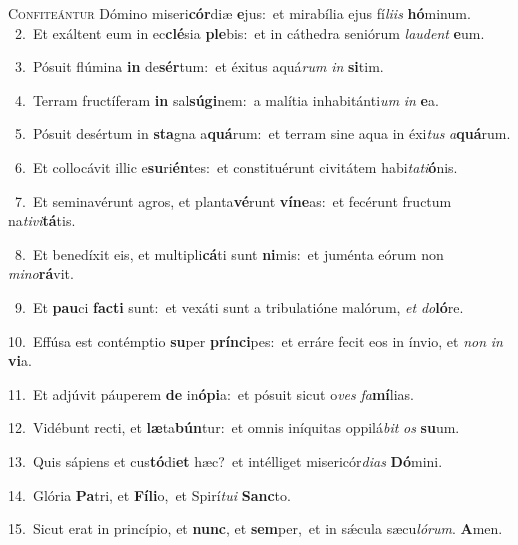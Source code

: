 \lettrine{\initial\textcolor{\initialcolor}{C}}{onfiteántur} Dómino miseri\-\textbf{cór}\-diæ \textbf{e}\-jus:~\star et mirabília ejus fí\-\textit{li}\-\textit{is} \textbf{hó}\-minum.\\
{\numbfont\textcolor{\numbcolor}{~2.}}~Et exáltent eum in ec\-\textbf{clé}\-sia \textbf{ple}\-bis:~\star et in cáthedra seniórum \textit{lau}\-\textit{dent} \textbf{e}\-um.\par
{\numbfont\textcolor{\numbcolor}{~3.}}~Pósuit flúmina \textbf{in} de\-\textbf{sér}\-tum:~\star et éxitus aquá\textit{rum} \textit{in} \textbf{si}\-tim.\par
{\numbfont\textcolor{\numbcolor}{~4.}}~Terram fructíferam \textbf{in} sal\-\textbf{sú}\-\textbf{gi}nem:~\star a malítia inhabitánti\textit{um} \textit{in} \textbf{e}\-a.\par
{\numbfont\textcolor{\numbcolor}{~5.}}~Pósuit desértum in \textbf{sta}\-gna a\-\textbf{quá}\-rum:~\star et terram sine aqua in éxi\textit{tus} \textit{a}\-\textbf{quá}rum.\par
{\numbfont\textcolor{\numbcolor}{~6.}}~Et collocávit illic e\-\textbf{su}\-ri\-\textbf{én}\-tes:~\star et constituérunt civitátem habi\-\textit{ta}\-\textit{ti}\textbf{ó}nis.\par
{\numbfont\textcolor{\numbcolor}{~7.}}~Et seminavérunt agros, et planta\-\textbf{vé}\-runt \textbf{ví}\-\textbf{ne}as:~\star et fecérunt fructum na\-\textit{ti}\-\textit{vi}\textbf{tá}tis.\par
{\numbfont\textcolor{\numbcolor}{~8.}}~Et benedíxit eis, et multipli\-\textbf{cá}\-ti sunt \textbf{ni}\-mis:~\star et juménta eórum non \textit{mi}\-\textit{no}\textbf{rá}vit.\par
{\numbfont\textcolor{\numbcolor}{~9.}}~Et \textbf{pau}\-ci \textbf{fac}\-\textbf{ti} sunt:~\star et vexáti sunt a tribulatióne malórum, \textit{et} \textit{do}\-\textbf{ló}re.\par
{\numbfont\textcolor{\numbcolor}{10.}}~Effúsa est contémptio \textbf{su}\-per \textbf{prín}\-\textbf{ci}pes:~\star et erráre fecit eos in ínvio, et \textit{non} \textit{in} \textbf{vi}\-a.\par
{\numbfont\textcolor{\numbcolor}{11.}}~Et adjúvit páuperem \textbf{de} in\-\textbf{ó}\-\textbf{pi}a:~\star et pósuit sicut o\textit{ves} \textit{fa}\-\textbf{mí}lias.\par
{\numbfont\textcolor{\numbcolor}{12.}}~Vidébunt recti, et \textbf{læ}\-ta\-\textbf{bún}\-tur:~\star et omnis iníquitas oppilá\textit{bit} \textit{os} \textbf{su}\-um.\par
{\numbfont\textcolor{\numbcolor}{13.}}~Quis sápiens et cus\-\textbf{tó}\-di\textbf{et} hæc?~\star et intélliget misericór\-\textit{di}\-\textit{as} \textbf{Dó}\-mini.\par
{\numbfont\textcolor{\numbcolor}{14.}}~Glória \textbf{Pa}\-tri, et \textbf{Fí}\-\textbf{li}o,~\star et Spirí\-\textit{tu}\-\textit{i} \textbf{Sanc}\-to.\par
{\numbfont\textcolor{\numbcolor}{15.}}~Sicut erat in princípio, et \textbf{nunc}\-, et \textbf{sem}\-per,~\star et in sǽcula sæcu\-\textit{ló}\-\textit{rum}. \textbf{A}\-men.\par
